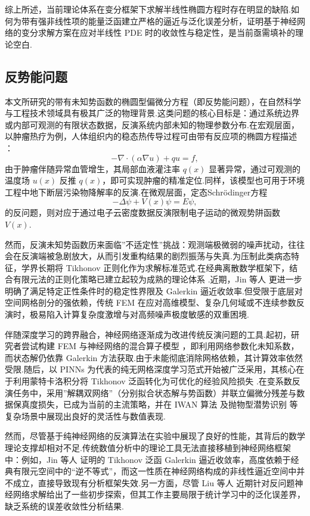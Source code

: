 综上所述，当前理论体系在变分框架下求解半线性椭圆方程时存在明显的缺陷.如何为带有强非线性项的能量泛函建立严格的逼近与泛化误差分析，证明基于神经网络的变分求解方案在应对半线性 PDE 时的收敛性与稳定性，是当前亟需填补的理论空白.


\subsection{反势能问题}
本文所研究的带有未知势函数的椭圆型偏微分方程（即反势能问题），在自然科学与工程技术领域具有极其广泛的物理背景.这类问题的核心目标是：通过系统边界或内部可观测的有限状态数据，反演系统内部未知的物理参数分布.在宏观层面，以肿瘤热疗为例，人体组织内的稳态热传导过程可由带有反应项的椭圆方程描述 \cite{Trucu2010space,Choulli2021Some}：
$$-\nabla \cdot (\alpha \nabla u) + qu = f,$$
由于肿瘤伴随异常血管增生，其局部血液灌注率 $q(x)$ 显著异常，通过可观测的温度场 $u(x)$ 反推 $q(x)$，即可实现肿瘤的精准定位.同样，该模型也可用于环境工程中地下断层污染物降解率的反演.在微观层面，定态Schr\"{o}dinger方程
$$-\Delta \psi + V(x)\psi = E\psi,$$
的反问题，则对应于通过电子云密度数据反演限制电子运动的微观势阱函数 $V(x)$.

然而，反演未知势函数历来面临”不适定性”挑战：观测端极微弱的噪声扰动，往往会在反演端被急剧放大，从而引发重构结果的剧烈振荡与失真.为压制此类病态特征，学界长期将 Tikhonov 正则化作为求解标准范式.在经典离散数学框架下，结合有限元法的正则化策略已建立起较为成熟的理论体系 \cite{Engl1989convergence,Hao2010convergence,Nickl2020Convergence}.近期，Jin 等人 \cite{jin2024stochastic} 更进一步明确了满足特定正性条件时的稳定性界限及 Galerkin 逼近收敛率.但受限于底层对空间网格剖分的强依赖，传统 FEM 在应对高维模型、复杂几何域或不连续参数反演时，极易陷入计算复杂度激增与对高频噪声极度敏感的双重困境.

伴随深度学习的跨界融合，神经网络逐渐成为改进传统反演问题的工具.起初，研究者尝试构建 FEM 与神经网络的混合算子模型 \cite{MITUSCH2021110651, Cen2023HybridNF}，即利用网络参数化未知系数，而状态解仍依靠 Galerkin 方法获取.由于未能彻底消除网格依赖，其计算效率依然受限.随后，以 PINNs 为代表的纯无网格深度学习范式开始被广泛采用，其核心在于利用蒙特卡洛积分将 Tikhonov 泛函转化为可优化的经验风险损失 \cite{Lu2021Physics,Jin2022Imaging}.在变系数反演任务中，采用”解耦双网络”（分别拟合状态解与势函数）并联立偏微分残差与数据保真度损失，已成为当前的主流策略\cite{Karniadakis2021physics}，并在 IWAN 算法 \cite{Bao2020Numerical} 及抛物型潜势识别 \cite{cao2025potential} 等复杂场景中展现出良好的灵活性与数值表现.

然而，尽管基于纯神经网络的反演算法在实验中展现了良好的性能，其背后的数学理论支撑却相对不足.传统数值分析中的理论工具无法直接移植到神经网络框架中：例如，Jin 等人 \cite{Jin2023Convergence} 证明的 Tikhonov 泛函 Galerkin 逼近收敛率，高度依赖于经典有限元空间中的“逆不等式”\cite{susanne1994mathematical}，而这一性质在神经网络构成的非线性逼近空间中并不成立，直接导致现有分析框架失效.另一方面，尽管 Liu 等人 \cite{Liu2023recovery} 近期针对反问题神经网络求解给出了一些初步探索，但其工作主要局限于统计学习中的泛化误差界，缺乏系统的误差收敛性分析结果.

